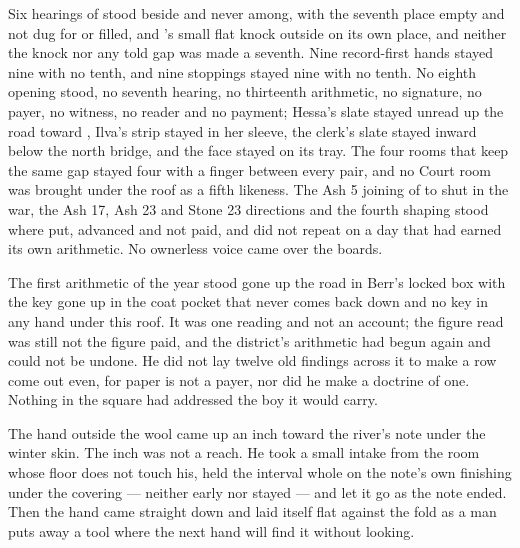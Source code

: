 Six hearings of  stood beside and never among, with the seventh place empty and not dug for or filled, and 's small flat knock outside on its own place, and neither the knock nor any told gap was made a seventh. Nine record-first hands stayed nine with no tenth, and nine stoppings stayed nine with no tenth. No eighth opening stood, no seventh hearing, no thirteenth arithmetic, no signature, no payer, no witness, no reader and no payment; Hessa's slate stayed unread up the road toward , Ilva's strip stayed in her sleeve, the clerk's slate stayed inward below the north bridge, and the face stayed on its tray. The four rooms that keep the same gap stayed four with a finger between every pair, and no Court room was brought under the roof as a fifth likeness. The Ash 5 joining of  to  shut in the war, the Ash 17, Ash 23 and Stone 23 directions and the fourth shaping stood where put, advanced and not paid, and did not repeat on a day that had earned its own arithmetic. No ownerless voice came over the boards.

The first arithmetic of the year stood gone up the road in Berr's locked box with the key gone up in the coat pocket that never comes back down and no key in any hand under this roof. It was one reading and not an account; the figure read was still not the figure paid, and the district's arithmetic had begun again and could not be undone. He did not lay twelve old findings across it to make a row come out even, for paper is not a payer, nor did he make a doctrine of one. Nothing in the square had addressed the boy it would carry.

The hand outside the wool came up an inch toward the river's note under the winter skin. The inch was not a reach. He took a small intake from the room whose floor does not touch his, held the interval whole on the note's own finishing under the covering --- neither early nor stayed --- and let it go as the note ended. Then the hand came straight down and laid itself flat against the fold as a man puts away a tool where the next hand will find it without looking.

